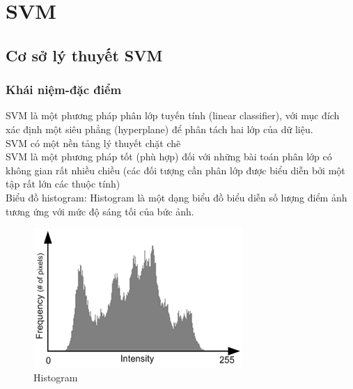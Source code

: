 \documentclass[a4paper,12pt]{report}
\begin{document}
\section{SVM}
\subsection{Cơ sở lý thuyết SVM}
\subsubsection{Khái niệm-đặc điểm  }
SVM là một phương pháp phân lớp tuyến tính (linear
classifier), với mục đích xác định một siêu phẳng
(hyperplane) để phân tách hai lớp của dữ liệu.\\
SVM có một nền tảng lý thuyết chặt chẽ\\
SVM là một phương pháp tốt (phù hợp) đối với những bài
toán phân lớp có không gian rất nhiều chiều (các đối
tượng cần phân lớp được biểu diễn bởi một tập rất lớn
các thuộc tính)\\

Biểu đồ histogram:
Histogram là một dạng biểu đồ biểu diễn số lượng điểm ảnh tương ứng với mức độ sáng tối của bức ảnh.\\
\begin{figure}[H]
\centering
\includegraphics[scale=0.9]{histogram.png}
\caption{Histogram}
\label{fig:histogram}
\end{figure}
\end{document}
